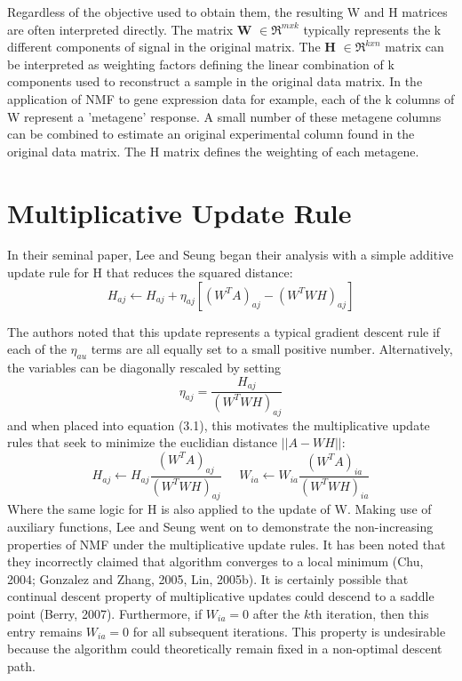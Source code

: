 \documentclass[final,leqno,onefignum,onetabnum]{siamltex1213}
\begin{document}
Regardless of the objective used to obtain them, the resulting W and H matrices are often interpreted directly. The matrix \textbf{W} $ \in \Re^{m x k}$ typically represents the k different components of signal in the original matrix. The \textbf{H} $ \in \Re^{k x n}$ matrix can be interpreted as weighting factors defining the linear combination of k components used to reconstruct a sample in the original data matrix. In the application of NMF to gene expression data for example, each of the k columns of W represent a 'metagene' response. A small number of these metagene columns can be combined to estimate an original experimental column found in the original data matrix. The H matrix defines the weighting of each metagene. 


\section{Multiplicative Update Rule} In their seminal paper, Lee and Seung began their analysis with a simple additive update rule for H that reduces the squared distance: 
\begin{equation}\label{au1}
 H_{aj} \leftarrow  H_{aj} + \eta_{aj} [ (W^T A)_{aj} - (W^T WH)_{aj}]
\end{equation}

The authors noted that this update represents a typical gradient descent rule if each of the $\eta_{au} $ terms are all equally set to a small positive number. Alternatively, the variables can be diagonally rescaled by setting
\begin{equation}\label{et1}
 \eta_{aj} = \frac{ H_{aj} }{(W^T WH)_{aj}}
\end{equation}
and when placed into equation (3.1), this motivates the multiplicative update rules that seek to minimize the euclidian distance $||A - WH ||$:
\begin{equation}\label{au1}
 H_{aj} \leftarrow  H_{aj} \frac{(W^T A)_{aj} }{ (W^T WH)_{aj} } \; \; \; \; \; W_{ia} \leftarrow  W_{ia} \frac{(W^T A)_{ia} }{ (W^T WH)_{ia} }
\end{equation}
Where the same logic for H is also applied to the update of W. Making use of auxiliary functions, Lee and Seung went on to demonstrate the non-increasing properties of NMF under the multiplicative update rules. It has been noted that they incorrectly claimed that algorithm converges to a local minimum (Chu, 2004; Gonzalez and Zhang, 2005, Lin, 2005b). It is certainly possible that continual descent property of multiplicative updates could descend to a saddle point (Berry, 2007). Furthermore, if $W_{ia} = 0$ after the $k$th iteration, then this entry remains $W_{ia} = 0$ for all subsequent iterations. This property is undesirable because the algorithm could theoretically remain fixed in a non-optimal descent path. \\
\end{document}
